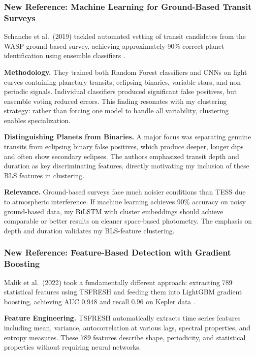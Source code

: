 \subsubsection{New Reference: Machine Learning for Ground-Based Transit Surveys}

Schanche et al.\ (2019) tackled automated vetting of transit candidates from the WASP ground-based survey, achieving approximately 90\% correct planet identification using ensemble classifiers \cite{Schanche2019mlexoplanet}.

\textbf{Methodology.} They trained both Random Forest classifiers and CNNs on light curves containing planetary transits, eclipsing binaries, variable stars, and non-periodic signals. Individual classifiers produced significant false positives, but ensemble voting reduced errors. This finding resonates with my clustering strategy: rather than forcing one model to handle all variability, clustering enables specialization.

\textbf{Distinguishing Planets from Binaries.} A major focus was separating genuine transits from eclipsing binary false positives, which produce deeper, longer dips and often show secondary eclipses. The authors emphasized transit depth and duration as key discriminating features, directly motivating my inclusion of these BLS features in clustering.

\textbf{Relevance.} Ground-based surveys face much noisier conditions than TESS due to atmospheric interference. If machine learning achieves 90\% accuracy on noisy ground-based data, my BiLSTM with cluster embeddings should achieve comparable or better results on cleaner space-based photometry. The emphasis on depth and duration validates my BLS-feature clustering.

\subsubsection{New Reference: Feature-Based Detection with Gradient Boosting}

Malik et al.\ (2022) took a fundamentally different approach: extracting 789 statistical features using TSFRESH and feeding them into LightGBM gradient boosting, achieving AUC 0.948 and recall 0.96 on Kepler data \cite{Malik2022exoplanetdetection}.

\textbf{Feature Engineering.} TSFRESH automatically extracts time series features including mean, variance, autocorrelation at various lags, spectral properties, and entropy measures. These 789 features describe shape, periodicity, and statistical properties without requiring neural networks.

